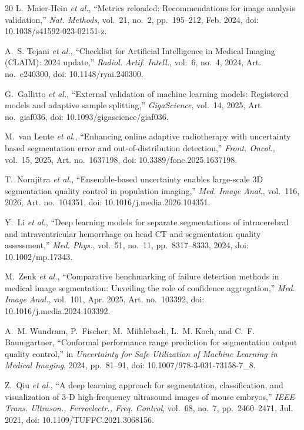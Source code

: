 \documentclass[journal,twoside]{IEEEtran}
\begin{document}
\begin{thebibliography}{20}
L.~Maier-Hein \emph{et al.}, ``Metrics reloaded: Recommendations for image analysis validation,'' \emph{Nat.
Methods}, vol.~21, no.~2, pp.~195--212, Feb. 2024, doi: 10.1038/s41592-023-02151-z.

A.~S. Tejani \emph{et al.}, ``Checklist for Artificial Intelligence in Medical Imaging (CLAIM): 2024 update,''
\emph{Radiol. Artif. Intell.}, vol.~6, no.~4, 2024, Art. no.~e240300, doi: 10.1148/ryai.240300.

G.~Gallitto \emph{et al.}, ``External validation of machine learning models: Registered models and adaptive sample
splitting,'' \emph{GigaScience}, vol.~14, 2025, Art. no.~giaf036, doi: 10.1093/gigascience/giaf036.

M.~van Lente \emph{et al.}, ``Enhancing online adaptive radiotherapy with uncertainty based segmentation error and
out-of-distribution detection,'' \emph{Front. Oncol.}, vol.~15, 2025, Art. no.~1637198, doi: 10.3389/fonc.2025.1637198.

T.~Norajitra \emph{et al.}, ``Ensemble-based uncertainty enables large-scale 3D segmentation quality control in
population imaging,'' \emph{Med. Image Anal.}, vol.~116, 2026, Art. no.~104351, doi: 10.1016/j.media.2026.104351.

Y.~Li \emph{et al.}, ``Deep learning models for separate segmentations of intracerebral and intraventricular
hemorrhage on head CT and segmentation quality assessment,'' \emph{Med. Phys.}, vol.~51, no.~11, pp.~8317--8333,
2024, doi: 10.1002/mp.17343.

M.~Zenk \emph{et al.}, ``Comparative benchmarking of failure detection methods in medical image segmentation:
Unveiling the role of confidence aggregation,'' \emph{Med. Image Anal.}, vol.~101, Apr. 2025, Art. no.~103392,
doi: 10.1016/j.media.2024.103392.

A.~M. Wundram, P.~Fischer, M.~M\"{u}hlebach, L.~M. Koch, and C.~F. Baumgartner, ``Conformal performance range
prediction for segmentation output quality control,'' in \emph{Uncertainty for Safe Utilization of Machine Learning
in Medical Imaging}, 2024, pp.~81--91, doi: 10.1007/978-3-031-73158-7\_8.

Z.~Qiu \emph{et al.}, ``A deep learning approach for segmentation, classification, and visualization of 3-D
high-frequency ultrasound images of mouse embryos,'' \emph{IEEE Trans. Ultrason., Ferroelectr., Freq. Control},
vol.~68, no.~7, pp.~2460--2471, Jul. 2021, doi: 10.1109/TUFFC.2021.3068156.


\end{thebibliography}
\end{document}
